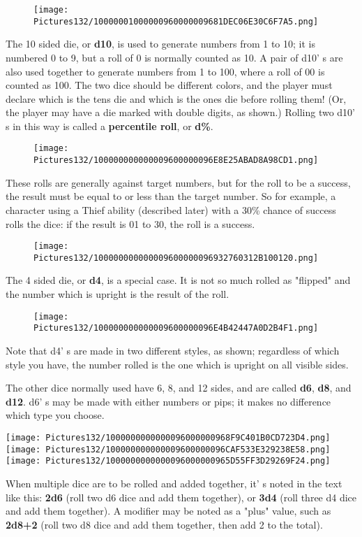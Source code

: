 \documentclass[a4paper,twoside,openany,10pt]{book}
\begin{document}
\begin{multicols}{2}
\begin{wrapfigure}{r}{1.77cm}
\texttt{[image: Pictures132/10000001000000960000009681DEC06E30C6F7A5.png]}
\end{wrapfigure}
The 10 sided die, or \textbf{d10}, is used to generate numbers from 1 to 10; it is numbered 0 to 9, but a roll of 0 is normally counted as 10. A pair of d10' s are also used together to generate numbers from 1 to 100, where a roll of 00 is counted as 100. The two dice should be different colors, and the player must declare which is the tens die and which is the ones die before rolling them! (Or, the player may have a die marked with double digits, as shown.) Rolling two d10' s in this way is called a \textbf{percentile roll}, or \textbf{d\%}.

\begin{wrapfigure}{r}{1.77cm}
	\texttt{[image: Pictures132/100000000000009600000096E8E25ABAD8A98CD1.png]}
\end{wrapfigure}
These rolls are generally against target numbers, but for the roll to be a success, the result must be equal to or less than the target number. So for example, a character using a Thief ability (described later) with a 30\% chance of success rolls the dice: if the result is 01 to 30, the roll is a success.
\begin{wrapfigure}{r}{1.77cm}
\texttt{[image: Pictures132/100000000000009600000096932760312B100120.png]}
\end{wrapfigure}

The 4 sided die, or \textbf{d4}, is a special case. It is not so much rolled as "flipped" and the number which is upright is the result of the roll.
\begin{wrapfigure}{r}{1.77cm}
\texttt{[image: Pictures132/100000000000009600000096E4B42447A0D2B4F1.png]}	
\end{wrapfigure}
Note that d4' s are made in two different styles, as shown; regardless of which style you have, the number rolled is the one which is upright on all visible sides.

The other dice normally used have 6, 8, and 12 sides, and are called \textbf{d6}, \textbf{d8}, and \textbf{d12}. d6' s may be made with either numbers or pips; it makes no difference which type you choose. 

\texttt{[image: Pictures132/1000000000000096000000968F9C401B0CD723D4.png]}
\texttt{[image: Pictures132/100000000000009600000096CAF533E329238E58.png]}
\texttt{[image: Pictures132/1000000000000096000000965D55FF3D29269F24.png]}

When multiple dice are to be rolled and added together, it' s noted in the text like this: \textbf{2d6} (roll two d6 dice and add them together), or  \textbf{3d4} (roll three d4 dice and add them together). A modifier may be noted as a "plus" value, such as \textbf{2d8+2} (roll two d8 dice and add them together, then add 2 to the total).

\end{multicols}
\end{document}
